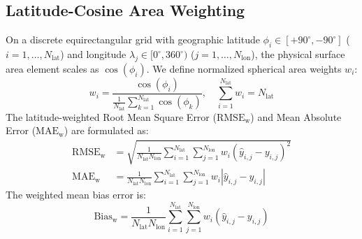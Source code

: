 \documentclass[10pt,twocolumn,letterpaper]{article}
\begin{document}
\subsection{Latitude-Cosine Area Weighting}
On a discrete equirectangular grid with geographic latitude $\phi_i \in [+90^\circ, -90^\circ]$ ($i = 1, \dots, N_\mathrm{lat}$) and longitude $\lambda_j \in [0^\circ, 360^\circ)$ ($j = 1, \dots, N_\mathrm{lon}$), the physical surface area element scales as $\cos(\phi_i)$. We define normalized spherical area weights $w_i$:
\begin{equation}
w_i = \frac{\cos(\phi_i)}{\frac{1}{N_\mathrm{lat}} \sum_{k=1}^{N_\mathrm{lat}} \cos(\phi_k)}, \quad \sum_{i=1}^{N_\mathrm{lat}} w_i = N_\mathrm{lat}
\label{eq:weights}
\end{equation}
The latitude-weighted Root Mean Square Error ($\mathrm{RMSE}_\mathrm{w}$) and Mean Absolute Error ($\mathrm{MAE}_\mathrm{w}$) are formulated as:
\begin{align}
\mathrm{RMSE}_\mathrm{w} &= \sqrt{ \frac{1}{N_\mathrm{lat} N_\mathrm{lon}} \sum_{i=1}^{N_\mathrm{lat}} \sum_{j=1}^{N_\mathrm{lon}} w_i \left( \hat{y}_{i,j} - y_{i,j} \right)^2 } \\
\mathrm{MAE}_\mathrm{w} &= \frac{1}{N_\mathrm{lat} N_\mathrm{lon}} \sum_{i=1}^{N_\mathrm{lat}} \sum_{j=1}^{N_\mathrm{lon}} w_i \left| \hat{y}_{i,j} - y_{i,j} \right|
\end{align}
The weighted mean bias error is:
\begin{equation}
\mathrm{Bias}_\mathrm{w} = \frac{1}{N_\mathrm{lat} N_\mathrm{lon}} \sum_{i=1}^{N_\mathrm{lat}} \sum_{j=1}^{N_\mathrm{lon}} w_i \left( \hat{y}_{i,j} - y_{i,j} \right)
\end{equation}
\end{document}
